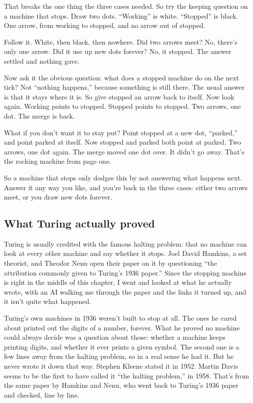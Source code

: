 \documentclass[11pt,twoside]{article}
\theoremstyle{thielethm}
\theoremstyle{thieledef}
\theoremstyle{thieledef}
\theoremstyle{thieledef}
\theoremstyle{thielethm}
\theoremstyle{thieleobs}
\theoremstyle{thielethm}
\begin{document}
That breaks the one thing the three cases needed. So try the keeping question on a machine that stops. Draw two dots. ``Working'' is white. ``Stopped'' is black. One arrow, from working to stopped, and no arrow out of stopped.

Follow it. White, then black, then nowhere. Did two arrows meet? No, there's only one arrow. Did it use up new dots forever? No, it stopped. The answer settled and nothing gave.

Now ask it the obvious question: what does a stopped machine do on the next tick? Not ``nothing happens,'' because something is still there. The usual answer is that it stays where it is. So give stopped an arrow back to itself. Now look again. Working points to stopped. Stopped points to stopped. Two arrows, one dot. The merge is back.

What if you don't want it to stay put? Point stopped at a new dot, ``parked,'' and point parked at itself. Now stopped and parked both point at parked. Two arrows, one dot again. The merge moved one dot over. It didn't go away. That's the rocking machine from page one.

So a machine that stops only dodges this by not answering what happens next. Answer it any way you like, and you're back in the three cases: either two arrows meet, or you draw new dots forever.

\subsection{What Turing actually proved}

Turing is usually credited with the famous halting problem: that no machine can look at every other machine and say whether it stops. Joel David Hamkins, a set theorist, and Theodor Nenu open their paper on it by questioning ``the attribution commonly given to Turing's 1936 paper.'' Since the stopping machine is right in the middle of this chapter, I went and looked at what he actually wrote, with an AI walking me through the paper and the links it turned up, and it isn't quite what happened.

Turing's own machines in 1936 weren't built to stop at all. The ones he cared about printed out the digits of a number, forever. What he proved no machine could always decide was a question about those: whether a machine keeps printing digits, and whether it ever prints a given symbol. The second one is a few lines away from the halting problem, so in a real sense he had it. But he never wrote it down that way. Stephen Kleene stated it in 1952. Martin Davis seems to be the first to have called it ``the halting problem,'' in 1958. That's from the same paper by Hamkins and Nenu, who went back to Turing's 1936 paper and checked, line by line.
\end{document}
